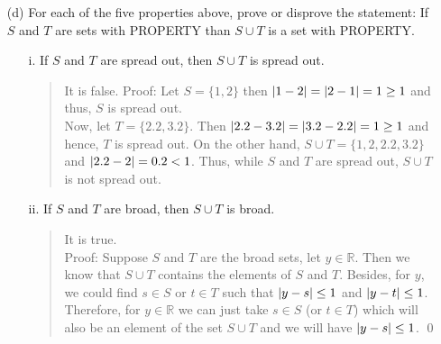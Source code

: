 \documentclass[12pt, a4paper]{article}                      %
\newcommand{\reals}{\mathbb{R}}
\DeclarePairedDelimiter\abs{\lvert}{\rvert}
\begin{document}
\begin{itemize}
\begin{itemize}

\item[]

\item[(d)]
For each of the five properties above, prove or disprove the statement: If $S$ and
$T$ are sets with PROPERTY than $S \cup T$ is a set with PROPERTY.
\begin{itemize}
\item[i.]
If $S$ and $T$ are spread out, then $S \cup T$ is spread out.
\begin{quote}
It is false. Proof: Let $S = \{1, 2\}$ then $\abs{1 - 2} = \abs{2 - 1} = 1 \geq 1$ and thus, $S$ is spread out.\\
Now, let $T = \{2.2, 3.2\}$. Then $\abs{2.2 - 3.2} = \abs{3.2 - 2.2} = 1 \geq 1$ and hence, $T$ is spread out. On the other
hand, $S \cup T = \{1, 2, 2.2, 3.2\}$ and $\abs{2.2 - 2} = 0.2 < 1$. Thus, while $S$ and $T$ are
spread out, $S \cup T$ is not spread out.
\end{quote}

\item[]

\item[ii.]
If $S$ and $T$ are broad, then $S \cup T$ is broad.
\begin{quote}
It is true.\\
Proof: Suppose $S$ and $T$ are the broad sets, let $y \in \reals$.
Then we know that $S \cup T$ contains the elements of $S$ and $T$.
Besides, for $y$, we could find $s \in S$ or $t \in T$ such that $\abs{y - s} \leq 1$
and $\abs{y - t} \leq 1$. Therefore, for $y \in \reals$ we can just take $s \in S$ (or $t \in T$) which will
also be an element of the set $S \cup T$ and we will have $\abs{y - s} \leq 1$.
\qed
\end{quote}


\end{itemize}
\end{itemize}
\end{itemize}
\end{document}
